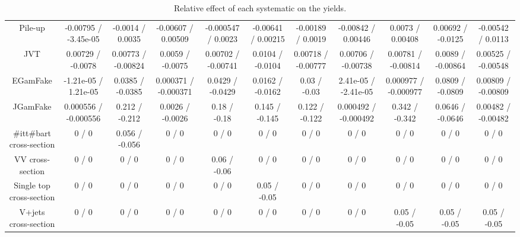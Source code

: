 \begin{table}[htbp]
\begin{center}
\begin{tabular}{|c|c|c|c|c|c|c|c|c|c|c|}
  Pile-up & -0.00795 / -3.45e-05 & -0.0014 / 0.0035 & -0.00607 / 0.00509 & -0.000547 / 0.0023 & -0.00641 / 0.00215 & -0.00189 / 0.0019 & -0.00842 / 0.00446 & 0.0073 / 0.00408 & 0.00692 / -0.0125 & -0.00542 / 0.0113 \\ 
  JVT & 0.00729 / -0.0078 & 0.00773 / -0.00824 & 0.0059 / -0.0075 & 0.00702 / -0.00741 & 0.0104 / -0.0104 & 0.00718 / -0.00777 & 0.00706 / -0.00738 & 0.00781 / -0.00814 & 0.0089 / -0.00864 & 0.00525 / -0.00548 \\ 
  EGamFake & -1.21e-05 / 1.21e-05 & 0.0385 / -0.0385 & 0.000371 / -0.000371 & 0.0429 / -0.0429 & 0.0162 / -0.0162 & 0.03 / -0.03 & 2.41e-05 / -2.41e-05 & 0.000977 / -0.000977 & 0.0809 / -0.0809 & 0.00809 / -0.00809 \\ 
  JGamFake & 0.000556 / -0.000556 & 0.212 / -0.212 & 0.0026 / -0.0026 & 0.18 / -0.18 & 0.145 / -0.145 & 0.122 / -0.122 & 0.000492 / -0.000492 & 0.342 / -0.342 & 0.0646 / -0.0646 & 0.00482 / -0.00482 \\ 
  #it{t#bar{t}} cross-section & 0 / 0 & 0.056 / -0.056 & 0 / 0 & 0 / 0 & 0 / 0 & 0 / 0 & 0 / 0 & 0 / 0 & 0 / 0 & 0 / 0 \\ 
  VV cross-section & 0 / 0 & 0 / 0 & 0 / 0 & 0.06 / -0.06 & 0 / 0 & 0 / 0 & 0 / 0 & 0 / 0 & 0 / 0 & 0 / 0 \\ 
  Single top cross-section & 0 / 0 & 0 / 0 & 0 / 0 & 0 / 0 & 0.05 / -0.05 & 0 / 0 & 0 / 0 & 0 / 0 & 0 / 0 & 0 / 0 \\ 
  V+jets cross-section & 0 / 0 & 0 / 0 & 0 / 0 & 0 / 0 & 0 / 0 & 0 / 0 & 0 / 0 & 0.05 / -0.05 & 0.05 / -0.05 & 0.05 / -0.05 \\ 
\hline 
\end{tabular} 
\caption{Relative effect of each systematic on the yields.} 
\end{center} 
\end{table} 
